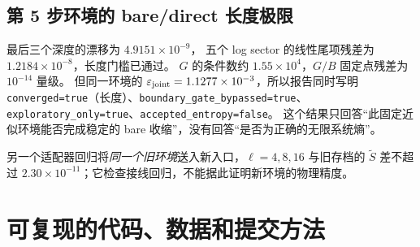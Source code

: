\documentclass[11pt]{article}
\newcommand{\eps}{\varepsilon}
\newcommand{\tS}{\widetilde S}
\newcommand{\code}[1]{{\small\texttt{#1}}}
\begin{document}
\subsection{第 5 步环境的 bare/direct 长度极限}
\begin{table}[htbp]\centering\small

\caption{冻结总第 5 步环境，只增加 LMPS 深度。
作业 11387300，完整带符号的 replica；没有重新优化 boundary。}
\label{tab:tail}
\end{table}
最后三个深度的漂移为 $4.9151\times10^{-9}$，
五个 log sector 的线性尾项残差为 $1.2184\times10^{-8}$，长度门槛已通过。
$G$ 的条件数约 $1.55\times10^4$，$G/B$ 固定点残差为 $10^{-14}$ 量级。
但同一环境的 $\eps_{\rm joint}=1.1277\times10^{-3}$，所以报告同时写明
\code{converged=true}（长度）、\code{boundary\_gate\_bypassed=true}、
\code{exploratory\_only=true}、\code{accepted\_entropy=false}。
这个结果只回答“此固定近似环境能否完成稳定的 bare 收缩”，没有回答“是否为正确的无限系统熵”。

另一个适配器回归将\emph{同一个旧环境}送入新入口，$\ell=4,8,16$ 与旧存档的
$\tS$ 差不超过 $2.30\times10^{-11}$；它检查接线回归，不能据此证明新环境的物理精度。

\section{可复现的代码、数据和提交方法}
\label{sec:run}
\end{document}
